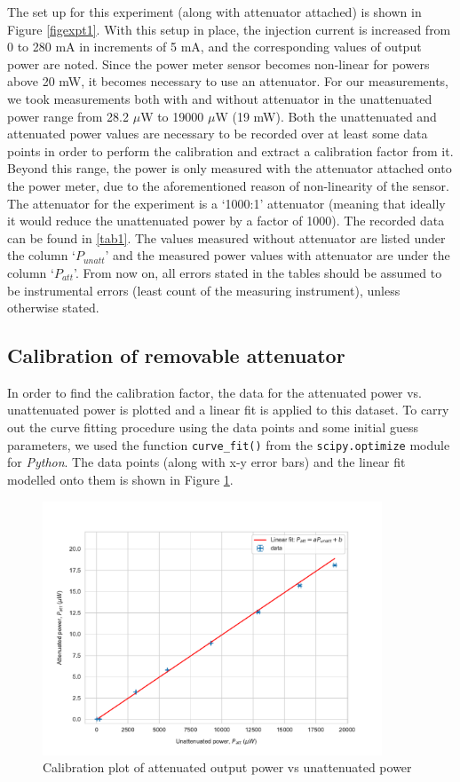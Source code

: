 The set up for this experiment (along with attenuator attached) is shown in Figure \ref{figexpt1}. With this setup in place, the injection current is increased from 0 to 280 mA in increments of 5 mA, and the corresponding values of output power are noted. Since the power meter sensor becomes non-linear for powers above 20 mW, it becomes necessary to use an attenuator. For our measurements, we took measurements both with and without attenuator in the unattenuated power range from 28.2 $\mu$W to 19000 $\mu$W (19 mW). Both the unattenuated and attenuated power values are necessary to be recorded over at least some data points in order to perform the calibration and extract a calibration factor from it. Beyond this range, the power is only measured with the attenuator attached onto the power meter, due to the aforementioned reason of non-linearity of the sensor. The attenuator for the experiment is a `1000:1' attenuator (meaning that ideally it would reduce the unattenuated power by a factor of 1000). The recorded data can be found in \ref{tab1}. The values measured without attenuator are listed under the column `$P_{unatt}$' and the measured power values with attenuator are under the column `$P_{att}$'. From now on, all errors stated in the tables should be assumed to be instrumental errors (least count of the measuring instrument), unless otherwise stated.

\subsection{Calibration of removable attenuator}
\label{Calib}
In order to find the calibration factor, the data for the attenuated power vs. unattenuated power is plotted and a linear fit is applied to this dataset. To carry out the curve fitting procedure using the data points and some initial guess parameters, we used the function \texttt{curve\_fit()} from the \texttt{scipy.optimize} module for \textit{Python}. The data points (along with x-y error bars) and the linear fit modelled onto them is shown in Figure \ref{figexpt2}.

\begin{figure}[H]
\includegraphics[width=0.9\textwidth]{./imagesandplots/attvsunattcalib.pdf}
\centering
\caption{Calibration plot of attenuated output power vs unattenuated power}
\label{figexpt2}
\end{figure}

